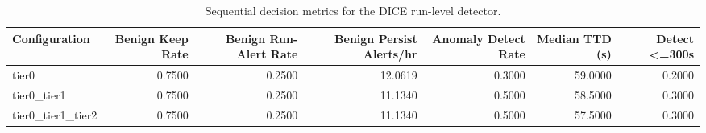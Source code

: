 \begin{table}[t]
\centering
\caption{Sequential decision metrics for the DICE run-level detector.}
\label{tab:dice_sequential_metrics}
\footnotesize
\begin{tabular}{lrrrrrr}
\toprule
Configuration & Benign Keep Rate & Benign Run-Alert Rate & Benign Persist Alerts/hr & Anomaly Detect Rate & Median TTD (s) & Detect <=300s \\
\midrule
tier0 & 0.7500 & 0.2500 & 12.0619 & 0.3000 & 59.0000 & 0.2000 \\
tier0_tier1 & 0.7500 & 0.2500 & 11.1340 & 0.5000 & 58.5000 & 0.3000 \\
tier0_tier1_tier2 & 0.7500 & 0.2500 & 11.1340 & 0.5000 & 57.5000 & 0.3000 \\
\bottomrule
\end{tabular}

\end{table}

